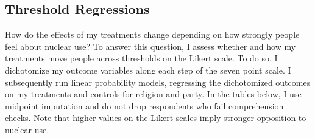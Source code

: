 \documentclass[12pt]{article}
\begin{document}
\subsection*{Threshold Regressions}

How do the effects of my treatments change depending on how strongly people feel about nuclear use? To answer this question, I assess whether and how my treatments move people across thresholds on the Likert scale. To do so, I dichotomize my outcome variables along each step of the seven point scale. I subsequently run linear probability models, regressing the dichotomized outcomes on my treatments and controls for religion and party. In the tables below, I use midpoint imputation and do not drop respondents who fail comprehension checks. Note that higher values on the Likert scales imply stronger opposition to nuclear use.\\
\end{document}
